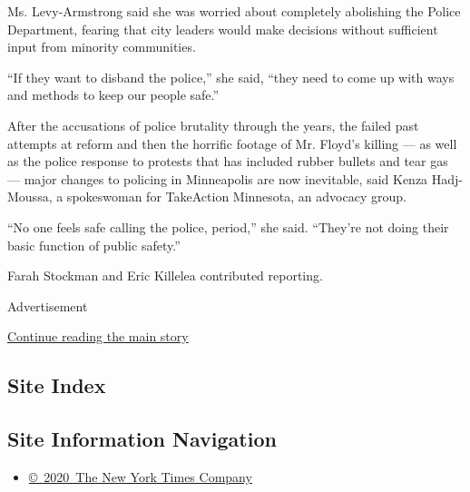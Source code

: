 Ms. Levy-Armstrong said she was worried about completely abolishing the
Police Department, fearing that city leaders would make decisions
without sufficient input from minority communities.

``If they want to disband the police,'' she said, ``they need to come up
with ways and methods to keep our people safe.''

After the accusations of police brutality through the years, the failed
past attempts at reform and then the horrific footage of Mr. Floyd's
killing --- as well as the police response to protests that has included
rubber bullets and tear gas --- major changes to policing in Minneapolis
are now inevitable, said Kenza Hadj-Moussa, a spokeswoman for TakeAction
Minnesota, an advocacy group.

``No one feels safe calling the police, period,'' she said. ``They're
not doing their basic function of public safety.''

Farah Stockman and Eric Killelea contributed reporting.

Advertisement

\protect\hyperlink{after-bottom}{Continue reading the main story}

\hypertarget{site-index}{%
\subsection{Site Index}\label{site-index}}

\hypertarget{site-information-navigation}{%
\subsection{Site Information
Navigation}\label{site-information-navigation}}

\begin{itemize}
\tightlist
\item
  \href{https://help.nytimes3xbfgragh.onion/hc/en-us/articles/115014792127-Copyright-notice}{©~2020~The
  New York Times Company}
\end{itemize}

